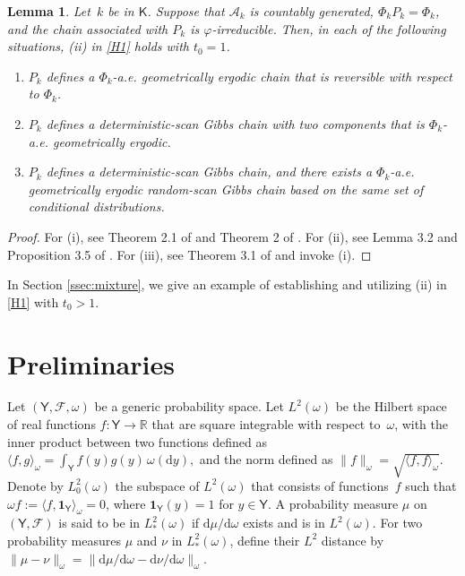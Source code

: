 \documentclass[12pt]{article}
\newcommand{\df}{\mathrm{d}}
\newcommand{\Y}{\mathsf{Y}}
\newcommand{\SF}{\mathcal{A}}
\newcommand{\F}{\mathcal{F}}
\newcommand{\ind}{\mathbf{1}}
\newtheorem{lemma}[theorem]{Lemma}
\begin{document}
\begin{lemma} \label{lem:Pk-convergence}
	Let~$k$ be in $\mathsf{K}$.
	Suppose that $\SF_k$ is countably generated, $\Phi_k P_k = \Phi_k$, and the chain associated with $P_k$ is $\varphi$-irreducible.
	Then, in each of the following situations, (ii) in \ref{H1} holds with $t_0 = 1$.
	\begin{enumerate}
		\item [(i)] $P_k$ defines a $\Phi_k$-a.e. geometrically ergodic chain that is reversible with respect to $\Phi_k$.
		\item [(ii)] $P_k$ defines a deterministic-scan Gibbs chain with two components that is $\Phi_k$-a.e. geometrically ergodic.
		\item [(iii)] $P_k$ defines a deterministic-scan Gibbs chain, and there exists a $\Phi_k$-a.e. geometrically ergodic random-scan Gibbs chain based on the same set of conditional distributions.
	\end{enumerate}
\end{lemma}
\begin{proof}
	For (i), see Theorem 2.1 of \cite{roberts1997geometric} and Theorem 2 of \cite{roberts2001geometric}.
	For (ii), see Lemma 3.2 and Proposition 3.5 of \cite{qin2020convergence}.
	For (iii), see Theorem 3.1 of \cite{chlebicka2023solidarity} and invoke (i).
\end{proof}


In Section \ref{ssec:mixture}, we give an example of establishing and utilizing (ii) in \ref{H1} with $t_0 > 1$.






\section{Preliminaries}  \label{sec:l2}


Let $(\Y, \F, \omega)$ be a generic probability space.
Let $L^2(\omega)$ be the Hilbert space of real functions $f: \Y \to \mathbb{R}$ that are square integrable with respect to~$\omega$, with the inner product between two functions defined as
$
\langle f, g \rangle_{\omega} = \int_{\Y} f(y) g(y) \, \omega(\df y),
$
and the norm defined as $\|f\|_{\omega} = \sqrt{\langle f, f \rangle_{\omega}}$.
Denote by $L_0^2(\omega)$ the subspace of $L^2(\omega)$ that consists of functions~$f$ such that $\omega f := \langle f, \ind_{\Y} \rangle_{\omega} = 0$, where $\ind_{\Y}(y) = 1$ for $y \in \Y$.
A probability measure $\mu$ on $(\Y, \F)$ is said to be in $L_*^2(\omega)$ if $\df \mu/ \df \omega$ exists and is in $L^2(\omega)$. 
For two probability measures $\mu$ and $\nu$ in $L_*^2(\omega)$, define their $L^2$ distance by $\|\mu - \nu\|_{\omega} = \|\df\mu/\df \omega - \df \nu/\df \omega\|_{\omega}$.
\end{document}
